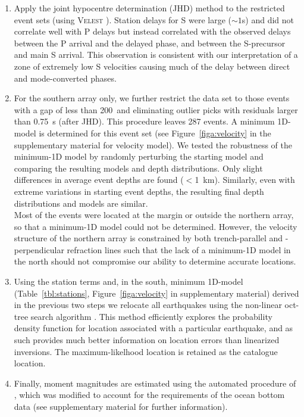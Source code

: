 \documentclass[reviewcopy]{elsarticle}
\begin{document}
\begin{enumerate}
\item Apply the joint
  hypocentre determination (JHD) method to the restricted event sets (using
  \textsc{Velest} \citep{kissling94}).  Station delays for S were large ($\sim 1$s) and did
  not correlate well with P delays but instead correlated with
  the observed delays between the P arrival and the delayed phase, and
between the S-precursor and main S arrival.  This observation is consistent
  with our interpretation of a zone of extremely low S velocities
  causing much of the delay between direct and mode-converted phases.
\item For the southern array only, we further restrict the data set to
  those events with a gap of less than 200\dg\ and eliminating outlier
  picks
  with residuals larger than 0.75~s (after JHD).
%
  This procedure leaves 287 events. A minimum 1D-model is determined
  for this event set \citep{kissling94} (see Figure~\ref{figa:velocity} in the supplementary material for velocity
model).  We tested the robustness of the minimum-1D
  model by randomly perturbing the starting model and comparing the resulting models and depth distributions.
  Only slight differences in average event depths are found
  ($<$1~km). Similarly, even with extreme variations in starting event
  depths,
 the resulting final depth distributions and models are
  similar. \\
  Most of the events were located at the margin or outside the
  northern array, so that a minimum-1D model could not be determined.
  However, the velocity structure of the northern array is
  constrained by both trench-parallel and -perpendicular refraction
  lines \citep{scherwath06,contreras-reyes07}
such
  that the lack of a minimum-1D model in the north should not
  compromise our ability to determine accurate
  locations.
\item Using the station terms and, in the south, minimum 1D-model
  (Table~\ref{tbl:stations}, Figure~\ref{figa:velocity} in supplementary material)
  derived in the previous two steps we relocate all earthquakes using
  the non-linear oct-tree search algorithm \citep{lomax00}.  This method efficiently
  explores the probability density function for location associated
  with a particular earthquake, and as such provides much better
  information on location errors than linearized inversions.  The
  maximum-likelhood location is retained as the catalogue location.
\item
Finally, moment magnitudes are estimated using the automated procedure
of \citet{ottemoeller03}, which was modified to account for the
requirements of the ocean bottom data (see supplementary material for
further information).
\end{enumerate}
\end{document}
